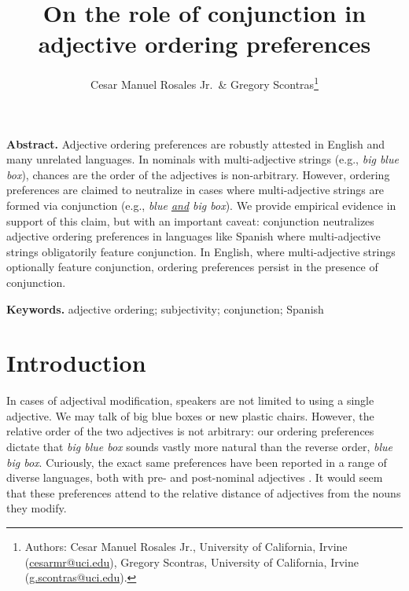 \documentclass[12pt,letterpaper]{article}
\title{
On the role of conjunction in adjective ordering preferences
}
\author{Cesar Manuel Rosales Jr.~\& Gregory Scontras\footnote{
Authors: Cesar Manuel Rosales Jr., University of California, Irvine (\href{mailto:CESARMR@uci.edu}{cesarmr@uci.edu}),
Gregory Scontras, University of California, Irvine (\href{mailto:g.scontras@uci.edu}{g.scontras@uci.edu}).
}
}
\renewenvironment{abstract}{%
\noindent\begin{minipage}{1\textwidth}
\setlength{\leftskip}{0.4in}
\setlength{\rightskip}{0.4in}
\textbf{Abstract.}}
{\end{minipage}}
\newenvironment{keywords}{%
\vspace{.5em}
\noindent\begin{minipage}{1\textwidth}
\setlength{\leftskip}{0.4in}
\setlength{\rightskip}{0.4in}
\textbf{Keywords.}}
{\end{minipage}}
\begin{document}
\setlength{\Extopsep}{6pt}
\setlength{\Exlabelsep}{9pt}		%


\maketitle

\begin{abstract}
Adjective ordering preferences are robustly attested in English and many unrelated languages. In nominals with multi-adjective strings (e.g., \emph{big blue box}), chances are the order of the adjectives is non-arbitrary. However, ordering preferences are claimed to neutralize in cases where multi-adjective strings are formed via conjunction (e.g., \emph{blue \uline{and} big box}). We provide empirical evidence in support of this claim, but with an important caveat: conjunction neutralizes adjective ordering preferences in languages like Spanish where multi-adjective strings obligatorily feature conjunction. In English, where multi-adjective strings optionally feature conjunction, ordering preferences persist in the presence of conjunction.
\end{abstract}

\begin{keywords}
adjective ordering; subjectivity; conjunction; Spanish
\end{keywords}

\section{Introduction}

In cases of adjectival modification, speakers are not limited to using a single adjective. We may talk of big blue boxes or new plastic chairs. However, the relative order of the two adjectives is not arbitrary: our ordering preferences dictate that \emph{big blue box} sounds vastly more natural than the reverse order, \emph{blue big box}. Curiously, the exact same preferences have been reported in a range of diverse languages, both with pre- and post-nominal adjectives \citep[e.g., Hungarian, Dutch, Mandarin Chinese, Indonesian, Tagalog;][]{Martin1969competence,hetzron1978,dixon1982,sproatshih1991,samontescontras2019}. It would seem that these preferences attend to the relative distance of adjectives from the nouns they modify.
\end{document}
